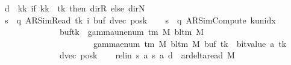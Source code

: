\begin{isabellebody}
\ {\isacharquery}{\kern0pt}d\ {\isacharequal}{\kern0pt}\ {\isachardoublequoteopen}{\isasymlambda}kk{\isachardot}{\kern0pt}\ if\ kk\ {\isacharequal}{\kern0pt}\ tk\ then\ dir{\isachardot}{\kern0pt}R\ else\ dir{\isachardot}{\kern0pt}N{\isachardoublequoteclose}\isanewline
\ \ \isamarkupfalse%
\ {\isacharquery}{\kern0pt}s\ {\isacharequal}{\kern0pt}\ {\isachardoublequoteopen}{\isacharparenleft}{\kern0pt}q{\isacharcomma}{\kern0pt}\ AR{\isacharunderscore}{\kern0pt}SimRead{\isacharcomma}{\kern0pt}\ tk{\isacharcomma}{\kern0pt}\ i{\isacharcomma}{\kern0pt}\ buf{\isacharcomma}{\kern0pt}\ dvec{\isacharcomma}{\kern0pt}\ posk{\isacharparenright}{\kern0pt}{\isachardoublequoteclose}\isanewline
\ \ \isamarkupfalse%
\ {\isacharquery}{\kern0pt}s{\isacharprime}{\kern0pt}\ {\isacharequal}{\kern0pt}\ {\isachardoublequoteopen}{\isacharparenleft}{\kern0pt}q{\isacharcomma}{\kern0pt}\ AR{\isacharunderscore}{\kern0pt}SimCompute{\isacharcomma}{\kern0pt}\ k{\isacharunderscore}{\kern0pt}unidx\ {}{\isacharcomma}{\kern0pt}\ {}{\isacharcomma}{\kern0pt}\isanewline
\ \ \ \ \ \ \ \ \ \ \ \ \ \ buf{\isacharparenleft}{\kern0pt}tk\ {\isacharcolon}{\kern0pt}{\isacharequal}{\kern0pt}\ gamma{\isacharunderscore}{\kern0pt}unenum\ {\isacharparenleft}{\kern0pt}{\isasymGamma}{\isacharunderscore}{\kern0pt}tm\ M{\isacharparenright}{\kern0pt}\ {\isacharparenleft}{\kern0pt}bl{\isacharunderscore}{\kern0pt}tm\ M{\isacharparenright}{\kern0pt}\isanewline
\ \ \ \ \ \ \ \ \ \ \ \ \ \ \ \ \ \ \ \ {\isacharparenleft}{\kern0pt}{}\ {\isacharasterisk}{\kern0pt}\ gamma{\isacharunderscore}{\kern0pt}enum\ {\isacharparenleft}{\kern0pt}{\isasymGamma}{\isacharunderscore}{\kern0pt}tm\ M{\isacharparenright}{\kern0pt}\ {\isacharparenleft}{\kern0pt}bl{\isacharunderscore}{\kern0pt}tm\ M{\isacharparenright}{\kern0pt}\ {\isacharparenleft}{\kern0pt}buf\ tk{\isacharparenright}{\kern0pt}\ {\isacharplus}{\kern0pt}\ bit{\isacharunderscore}{\kern0pt}value\ {\isacharparenleft}{\kern0pt}{\isacharquery}{\kern0pt}a\ tk{\isacharparenright}{\kern0pt}{\isacharparenright}{\kern0pt}{\isacharparenright}{\kern0pt}{\isacharcomma}{\kern0pt}\isanewline
\ \ \ \ \ \ \ \ \ \ \ \ \ \ dvec{\isacharcomma}{\kern0pt}\ posk{\isacharparenright}{\kern0pt}{\isachardoublequoteclose}\isanewline
\ \ \isamarkupfalse%
\ rel{\isacharunderscore}{\kern0pt}in{\isacharcolon}{\kern0pt}\ {\isachardoublequoteopen}{\isacharparenleft}{\kern0pt}{\isacharquery}{\kern0pt}s{\isacharcomma}{\kern0pt}\ {\isacharquery}{\kern0pt}a{\isacharcomma}{\kern0pt}\ {\isacharquery}{\kern0pt}s{\isacharprime}{\kern0pt}{\isacharcomma}{\kern0pt}\ {\isacharquery}{\kern0pt}a{\isacharcomma}{\kern0pt}\ {\isacharquery}{\kern0pt}d{\isacharparenright}{\kern0pt}\ {\isasymin}\ ar{\isacharunderscore}{\kern0pt}delta{\isacharunderscore}{\kern0pt}read\ M{\isachardoublequoteclose}\isanewline

\end{isabellebody}
